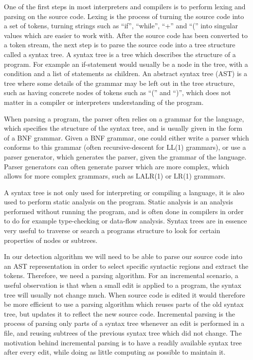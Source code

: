 One of the first steps in most interpreters and compilers is to perform lexing and parsing
on the source code. Lexing is the process of turning the source code into a set of tokens,
turning strings such as ``if'', ``while'', ``+'' and ``('' into singular values which are
easier to work with. After the source code has been converted to a token stream, the next
step is to parse the source code into a tree structure called a syntax tree. A syntax tree
is a tree which describes the structure of a program. For example an if-statement would
usually be a node in the tree, with a condition and a list of statements as children. An
abstract syntax tree (AST) is a tree where some details of the grammar may be left out in
the tree structure, such as having concrete nodes of tokens such as ``('' and ``)'', which
does not matter in a compiler or interpreters understanding of the program.

When parsing a program, the parser often relies on a grammar for the language, which
specifies the structure of the syntax tree, and is usually given in the form of a BNF
grammar. Given a BNF grammar, one could either write a parser which conforms to this
grammar (often recursive-descent for LL(1) grammars), or use a parser generator, which
generates the parser, given the grammar of the language. Parser generators can often
generate parser which are more complex, which allows for more complex grammars, such as
LALR(1) or LR(1) grammars.

A syntax tree is not only used for interpreting or compiling a language, it is also used
to perform static analysis on the program. Static analysis is an analysis performed
without running the program, and is often done in compilers in order to do for example
type-checking or data-flow analysis. Syntax trees are in essence very useful to traverse
or search a programs structure to look for certain properties of nodes or subtrees. 

In our detection algorithm we will need to be able to parse our source code into an AST
representation in order to select specific syntactic regions and extract the tokens.
Therefore, we need a parsing algorithm. For an incremental scenario, a useful observation
is that when a small edit is applied to a program, the syntax tree will usually not change
much. When source code is edited it would therefore be more efficient to use a parsing algorithm which reuses parts of the old syntax tree, but updates it to
reflect the new source code. Incremental parsing is the process of parsing only parts of a
syntax tree whenever an edit is performed in a file, and reusing subtrees of the previous
syntax tree which did not change. The motivation behind incremental parsing is to have a
readily available syntax tree after every edit, while doing as little computing as
possible to maintain it.

